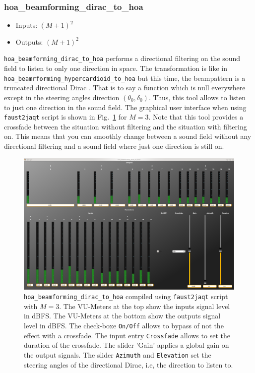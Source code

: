 \documentclass[10pt,a4paper]{article}
\begin{document}
\subsubsection{hoa\_beamforming\_dirac\_to\_hoa}
\begin{itemize}
\item Inputs: $(M+1)^2$
\item Outputs: $(M+1)^2$
\end{itemize}
\lstinline'hoa_beamforming_dirac_to_hoa' performs a directional filtering on the sound field to listen to only one direction in space. The transformation is like in \lstinline'hoa_beamrforming_hypercardioid_to_hoa' but this time, the beampattern is a truncated directional Dirac \cite{lecomte2016filtrage}. That is to say a function which is null everywhere except in the steering angles direction $(\theta_0,\delta_0)$. Thus, this tool allows to listen to just one direction in the sound field.  The graphical user interface when using \lstinline'faust2jaqt' script is shown in Fig.~\ref{fig:hoa_beamforming_dirac_to_hoa} for $M=3$. Note that this tool provides a crossfade between the situation without filtering and the situation with filtering on. This means that you can smoothly change between a sound field without any directional filtering and a sound field where just one direction is still on.
\begin{figure}[!ht]
\centering
\includegraphics[width=\columnwidth]{hoa_beamforming_dirac_to_hoa.png}
\caption{\lstinline'hoa_beamforming_dirac_to_hoa' compiled using \lstinline'faust2jaqt' script with $M=3$. The VU-Meters at the top show the inputs signal level in dBFS. The VU-Meters at the bottom show the outputs signal level in dBFS. The check-boxe \lstinline'On/Off' allows to bypass of not the effect with a crossfade. The input entry \lstinline'Crossfade' allows to set the duration of the crossfade. The slider 'Gain' applies a global gain on the output signals. The slider \lstinline'Azimuth' and \lstinline'Elevation' set the steering angles of the directional Dirac, i.e, the direction to listen to.}
\label{fig:hoa_beamforming_dirac_to_hoa}
\end{figure}
\end{document}

